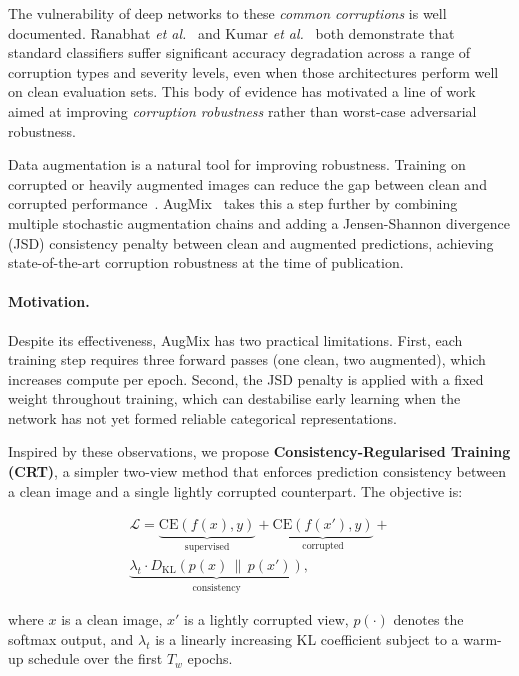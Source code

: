 \documentclass[10pt,twocolumn]{article}
\begin{document}
The vulnerability of deep networks to these \emph{common corruptions} is well documented. Ranabhat \emph{et al.}~\cite{ranabhat2025shapebias} and Kumar \emph{et al.}~\cite{kumar2026demhec} both demonstrate that standard classifiers suffer significant accuracy degradation across a range of corruption types and severity levels, even when those architectures perform well on clean evaluation sets. This body of evidence has motivated a line of work aimed at improving \emph{corruption robustness} rather than worst-case adversarial robustness.

Data augmentation is a natural tool for improving robustness. Training on corrupted or heavily augmented images can reduce the gap between clean and corrupted performance~\cite{erichson2024noisymix,kumar2026demhec}. AugMix~\cite{hendrycks2020augmix} takes this a step further by combining multiple stochastic augmentation chains and adding a Jensen-Shannon divergence (JSD) consistency penalty between clean and augmented predictions, achieving state-of-the-art corruption robustness at the time of publication.

\paragraph{Motivation.} Despite its effectiveness, AugMix has two practical limitations. First, each training step requires three forward passes (one clean, two augmented), which increases compute per epoch. Second, the JSD penalty is applied with a fixed weight throughout training, which can destabilise early learning when the network has not yet formed reliable categorical representations.

Inspired by these observations, we propose \textbf{Consistency-Regularised Training (CRT)}, a simpler two-view method that enforces prediction consistency between a clean image and a single lightly corrupted counterpart. The objective is:

\begin{equation}
\begin{aligned}
\mathcal{L} = \underbrace{\mathrm{CE}(f(x), y)}_{\text{supervised}} + \underbrace{\mathrm{CE}(f(x'), y)}_{\text{corrupted}} + \\ 
\underbrace{\lambda_t \cdot D_{\mathrm{KL}}\!\left(p(x) \,\|\, p(x')\right)}_{\text{consistency}},
\label{eq:loss}
\end{aligned}
\end{equation}

where $x$ is a clean image, $x'$ is a lightly corrupted view, $p(\cdot)$ denotes the softmax output, and $\lambda_t$ is a linearly increasing KL coefficient subject to a warm-up schedule over the first $T_w$ epochs.
\end{document}
